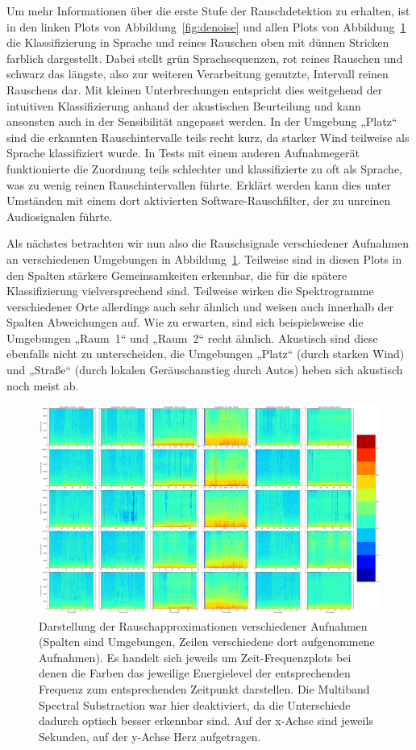 \documentclass[
	fontsize=10.5pt,
	marginpar=false,
	ngerman,
	accentcolor=3d
	]{tudapub}
\begin{document}
Um mehr Informationen über die erste Stufe der Rauschdetektion zu erhalten, ist in den linken Plots von Abbildung~\ref{fig:denoise} und allen Plots von Abbildung~\ref{fig:compare} die Klassifizierung in Sprache und reines Rauschen oben mit dünnen Stricken farblich dargestellt. Dabei stellt grün Sprachsequenzen, rot reines Rauschen und schwarz das längste, also zur weiteren Verarbeitung genutzte, Intervall reinen Rauschens dar. Mit kleinen Unterbrechungen entspricht dies weitgehend der intuitiven Klassifizierung anhand der akustischen Beurteilung und kann ansonsten auch in der Sensibilität angepasst werden. In der Umgebung „Platz“ sind die erkannten Rauschintervalle teils recht kurz, da starker Wind teilweise als Sprache klassifiziert wurde. In Tests mit einem anderen Aufnahmegerät funktionierte die Zuordnung teils schlechter und klassifizierte zu oft als Sprache, was zu wenig reinen Rauschintervallen führte. Erklärt werden kann dies unter Umständen mit einem dort aktivierten Software-Rauschfilter, der zu unreinen Audiosignalen führte.

Als nächstes betrachten wir nun also die Rauschsignale verschiedener Aufnahmen an verschiedenen Umgebungen in Abbildung~\ref{fig:compare}. Teilweise sind in diesen Plots in den Spalten stärkere Gemeinsamkeiten erkennbar, die für die spätere Klassifizierung vielversprechend sind. Teilweise wirken die Spektrogramme verschiedener Orte allerdings auch sehr ähnlich und weisen auch innerhalb der Spalten Abweichungen auf. Wie zu erwarten, sind sich beispielsweise die Umgebungen „Raum~1“ und „Raum~2“ recht ähnlich. Akustisch sind diese ebenfalls nicht zu unterscheiden, die Umgebungen „Platz“ (durch starken Wind) und „Straße“ (durch lokalen Geräuschanstieg durch Autos) heben sich akustisch noch meist ab.

\begin{figure}[h]
	\centering
	\includegraphics[width=1.0\textwidth]{media/comp}
	\caption{Darstellung der Rauschapproximationen verschiedener Aufnahmen (Spalten sind Umgebungen, Zeilen verschiedene dort aufgenommene Aufnahmen). Es handelt sich jeweils um Zeit-Frequenzplots bei denen die Farben das jeweilige Energielevel der entsprechenden Frequenz zum entsprechenden Zeitpunkt darstellen. Die Multiband Spectral Substraction war hier deaktiviert, da die Unterschiede dadurch optisch besser erkennbar sind. Auf der x-Achse sind jeweils Sekunden, auf der y-Achse Herz aufgetragen.}
	\label{fig:compare}
\end{figure}
\end{document}
